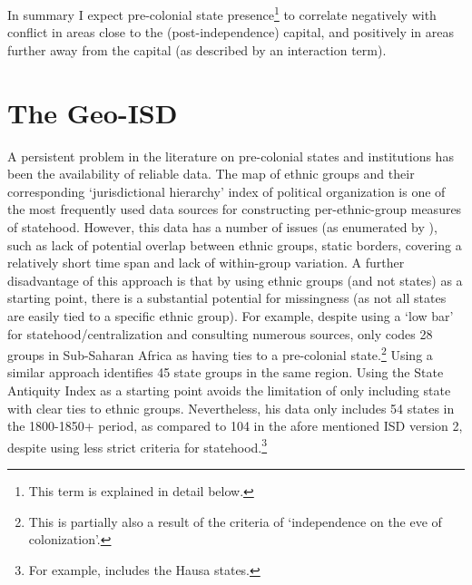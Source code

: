 \documentclass[12pt]{article}
\begin{document}
In summary I expect pre-colonial state presence\footnote{This term is explained
in detail below.} to correlate negatively with conflict in areas close to the
(post-independence) capital, and positively in areas further away from the
capital (as described by an interaction term).

\section{The Geo-ISD}

A persistent problem in the literature on pre-colonial states and institutions
has been the availability of reliable data. The \citet{Murdock1967} map of
ethnic groups and their corresponding `jurisdictional hierarchy' index of
political organization is one of the most frequently used data sources for
constructing per-ethnic-group measures of statehood. However, this data has a
number of issues (as enumerated by \citet{Michalopoulos2018}), such as lack of
potential overlap between ethnic groups, static borders, covering a relatively
short time span and lack of within-group variation. A further disadvantage of
this approach is that by using ethnic groups (and not states) as a starting
point, there is a substantial potential for missingness (as not all states are
easily tied to a specific ethnic group). For example, \citet{Paine2019} despite
using a `low bar' for statehood/centralization and consulting numerous sources,
only codes 28 groups in Sub-Saharan Africa as having ties to a pre-colonial
state.\footnote{This is partially also a result of the criteria of `independence
on the eve of colonization'.} Using a similar approach \citet{Wig2016}
identifies 45 state groups in the same region. Using the State Antiquity Index
\citep{Bockstette2012} as a starting point \citet{Depetris-Chauvin2016} avoids
the limitation of only including state with clear ties to ethnic groups.
Nevertheless, his data only includes 54 states in the 1800-1850+ period, as
compared to 104 in the afore mentioned ISD version 2, despite using less strict
criteria for statehood.\footnote{For example, \citet{Depetris-Chauvin2016}
includes the Hausa states.}

\end{document}
